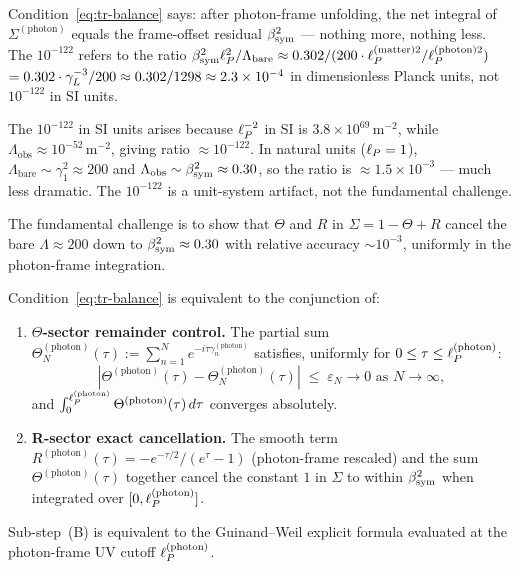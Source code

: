\begin{remark}
\label{rem:open}
Condition~\eqref{eq:tr-balance} says: after photon-frame unfolding,
the net integral of $\Sigma^{(\mathrm{photon})}$ equals the frame-offset
residual $\beta_{\mathrm{sym}}^2$ — nothing more, nothing less. The $10^{-122}$ refers
to the ratio $\beta_{\mathrm{sym}}^2\ell_P^{2}/\Lambda_{\mathrm{bare}} \approx 0.302 /
(200\cdot\ell_P^{(\mathrm{matter})2}/\ell_P^{(\mathrm{photon})2})$
$= 0.302 \cdot \gamma_L^{-3} / 200 \approx 0.302/1298 \approx 2.3\times
10^{-4}$ in dimensionless Planck units, not $10^{-122}$ in SI units.

\medskip
\noindent The $10^{-122}$ in SI units arises because $\ell_P^{-2}$ in SI is
$3.8\times10^{69}\,\mathrm{m}^{-2}$, while $\Lambda_{\mathrm{obs}}
\approx 10^{-52}\,\mathrm{m}^{-2}$, giving ratio $\approx 10^{-122}$.
In natural units ($\ell_P=1$), $\Lambda_{\mathrm{bare}} \sim \gamma_1^2
\approx 200$ and $\Lambda_{\mathrm{obs}} \sim \beta_{\mathrm{sym}}^2 \approx 0.30$,
so the ratio is $\approx 1.5\times 10^{-3}$ — much less dramatic. The
$10^{-122}$ is a unit-system artifact, not the fundamental challenge.

\medskip
\noindent The fundamental challenge is to show that $\Theta$ and $R$ in
$\Sigma = 1 - \Theta + R$ cancel the bare $\Lambda \approx 200$ down to
$\beta_{\mathrm{sym}}^2 \approx 0.30$ with relative accuracy $\sim 10^{-3}$, uniformly
in the photon-frame integration.
\end{remark}

\begin{proposition}
\label{prop:open-steps}
Condition~\eqref{eq:tr-balance} is equivalent to the conjunction of:
\begin{enumerate}
\item[\textbf{(A)}] \textbf{$\Theta$-sector remainder control.}
  The partial sum $\Theta^{(\mathrm{photon})}_N(\tau) :=
  \sum_{n=1}^N e^{-i\tau\gamma_n^{(\mathrm{photon})}}$
  satisfies, uniformly for $0 \leq \tau \leq \ell_P^{(\mathrm{photon})}$:
  \[
    \left|\Theta^{(\mathrm{photon})}(\tau)
    - \Theta^{(\mathrm{photon})}_N(\tau)\right|
    \;\leq\; \varepsilon_N \to 0 \text{ as } N\to\infty,
  \]
  and $\int_0^{\ell_P^{(\mathrm{photon})}} \Theta^{(\mathrm{photon})}(\tau)\,d\tau$
  converges absolutely.
\item[\textbf{(B)}] \textbf{R-sector exact cancellation.}
  The smooth term $R^{(\mathrm{photon})}(\tau) = -e^{-\tau/2}/(e^\tau-1)$
  (photon-frame rescaled) and the sum
  $\Theta^{(\mathrm{photon})}(\tau)$ together cancel the constant $1$
  in $\Sigma$ to within $\beta_{\mathrm{sym}}^2$ when integrated over
  $[0, \ell_P^{(\mathrm{photon})}]$.
\end{enumerate}
Sub-step~(B) is equivalent to the Guinand--Weil explicit formula
evaluated at the photon-frame UV cutoff $\ell_P^{(\mathrm{photon})}$.
\end{proposition}

